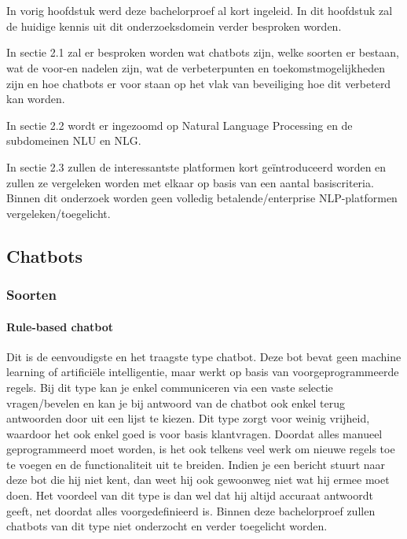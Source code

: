 \chapter{}
\label{ch:stand-van-zaken}

In vorig hoofdstuk werd deze bachelorproef al kort ingeleid. In dit hoofdstuk zal de huidige kennis uit dit onderzoeksdomein verder besproken worden.

In sectie 2.1 zal er besproken worden wat chatbots zijn, welke soorten er bestaan, wat de voor-en nadelen zijn, wat de verbeterpunten en toekomstmogelijkheden zijn en hoe chatbots er voor staan op het vlak van beveiliging hoe dit verbeterd kan worden.

In sectie 2.2 wordt er ingezoomd op Natural Language Processing en de subdomeinen NLU en NLG.

In sectie 2.3 zullen de interessantste platformen kort geïntroduceerd worden en zullen ze vergeleken worden met elkaar op basis van een aantal basiscriteria. Binnen dit onderzoek worden geen volledig betalende/enterprise NLP-platformen vergeleken/toegelicht.

\newpage
\section{Chatbots}
\label{sec:chatbots}

\subsection{Soorten}
\label{subsec:soorten}

\subsubsection{Rule-based chatbot}
\label{subsubsec:chatbots-soorten-rule-based-chatbot}

Dit is de eenvoudigste en het traagste type chatbot. Deze bot bevat geen machine learning of artificiële intelligentie, maar werkt op basis van voorgeprogrammeerde regels. Bij dit type kan je enkel communiceren via een vaste selectie vragen/bevelen en kan je bij antwoord van de chatbot ook enkel terug antwoorden door uit een lijst te kiezen. Dit type zorgt voor weinig vrijheid, waardoor het ook enkel goed is voor basis klantvragen. Doordat alles manueel geprogrammeerd moet worden, is het ook telkens veel werk om nieuwe regels toe te voegen en de functionaliteit uit te breiden. Indien je een bericht stuurt naar deze bot die hij niet kent, dan weet hij ook gewoonweg niet wat hij ermee moet doen. Het voordeel van dit type is dan wel dat hij altijd accuraat antwoordt geeft, net doordat alles voorgedefinieerd is. Binnen deze bachelorproef zullen chatbots van dit type niet onderzocht en verder toegelicht worden.

